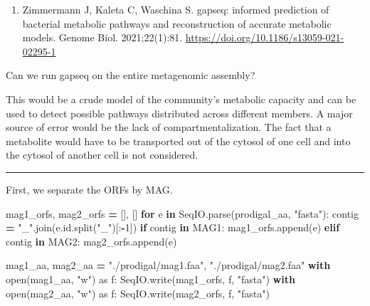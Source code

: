 \documentclass[
]{book}
\newenvironment{Shaded}{\begin{snugshade}}{\end{snugshade}}
\newcommand{\BuiltInTok}[1]{#1}
\newcommand{\ControlFlowTok}[1]{\textcolor[rgb]{0.13,0.29,0.53}{\textbf{#1}}}
\newcommand{\DecValTok}[1]{\textcolor[rgb]{0.00,0.00,0.81}{#1}}
\newcommand{\ImportTok}[1]{#1}
\newcommand{\KeywordTok}[1]{\textcolor[rgb]{0.13,0.29,0.53}{\textbf{#1}}}
\newcommand{\NormalTok}[1]{#1}
\newcommand{\OperatorTok}[1]{\textcolor[rgb]{0.81,0.36,0.00}{\textbf{#1}}}
\newcommand{\StringTok}[1]{\textcolor[rgb]{0.31,0.60,0.02}{#1}}
\providecommand{\tightlist}{%
  \setlength{\itemsep}{0pt}\setlength{\parskip}{0pt}}
\begin{document}
\begin{enumerate}
\def\labelenumi{\arabic{enumi}.}
\tightlist
\item
  Zimmermann J, Kaleta C, Waschina S. gapseq: informed prediction of bacterial metabolic pathways and reconstruction of accurate metabolic models. Genome Biol. 2021;22(1):81. \url{https://doi.org/10.1186/s13059-021-02295-1}
\end{enumerate}

Can we run gapseq on the entire metagenomic assembly?

This would be a crude model of the community's metabolic capacity and can be used to detect possible pathways distributed across
different members. A major source of error would be the lack of compartmentalization. The fact that a metabolite would have to be
transported out of the cytosol of one cell and into the cytosol of another cell is not considered.

\begin{center}\rule{0.5\linewidth}{0.5pt}\end{center}

First, we separate the ORFs by MAG.

\begin{Shaded}
\begin{Highlighting}[numbers=left,,]
\NormalTok{mag1\_orfs, mag2\_orfs }\OperatorTok{=}\NormalTok{ [], []}
\ControlFlowTok{for}\NormalTok{ e }\KeywordTok{in}\NormalTok{ SeqIO.parse(prodigal\_aa, }\StringTok{"fasta"}\NormalTok{):}
\NormalTok{    contig }\OperatorTok{=} \StringTok{"\_"}\NormalTok{.join(e.}\BuiltInTok{id}\NormalTok{.split(}\StringTok{"\_"}\NormalTok{)[:}\OperatorTok{{-}}\DecValTok{1}\NormalTok{])}
    \ControlFlowTok{if}\NormalTok{ contig }\KeywordTok{in}\NormalTok{ MAG1:}
\NormalTok{        mag1\_orfs.append(e)}
    \ControlFlowTok{elif}\NormalTok{ contig }\KeywordTok{in}\NormalTok{ MAG2:}
\NormalTok{        mag2\_orfs.append(e)}

\NormalTok{mag1\_aa, mag2\_aa }\OperatorTok{=} \StringTok{"./prodigal/mag1.faa"}\NormalTok{, }\StringTok{"./prodigal/mag2.faa"}
\ControlFlowTok{with} \BuiltInTok{open}\NormalTok{(mag1\_aa, }\StringTok{"w"}\NormalTok{) }\ImportTok{as}\NormalTok{ f:}
\NormalTok{    SeqIO.write(mag1\_orfs, f, }\StringTok{"fasta"}\NormalTok{)}
\ControlFlowTok{with} \BuiltInTok{open}\NormalTok{(mag2\_aa, }\StringTok{"w"}\NormalTok{) }\ImportTok{as}\NormalTok{ f:}
\NormalTok{    SeqIO.write(mag2\_orfs, f, }\StringTok{"fasta"}\NormalTok{)}
\end{Highlighting}
\end{Shaded}
\end{document}
